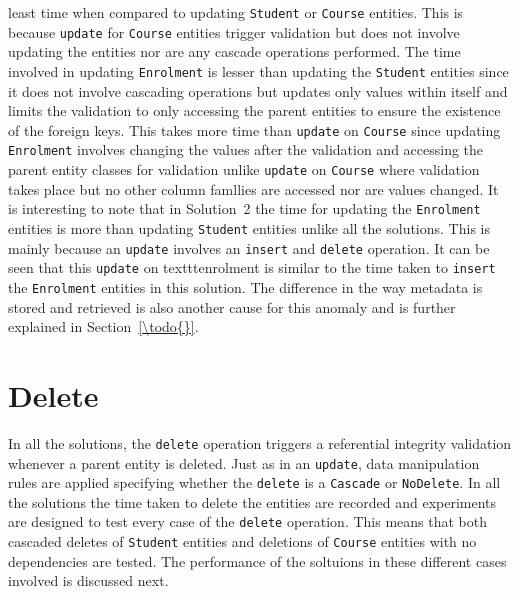 least time when compared to updating \texttt{Student} or \texttt{Course}
entities.
This is because \texttt{update} for \texttt{Course} entities trigger validation
but does not involve updating the entities nor are any cascade operations performed.
The time involved in updating \texttt{Enrolment} is lesser than updating the
\texttt{Student} entities since it does not involve cascading operations but
updates only values within itself and limits the validation to only accessing
the parent entities to ensure the existence of the foreign keys. This takes more
time than \texttt{update} on \texttt{Course} since updating \texttt{Enrolment}
involves changing the values after the validation and accessing the parent
entity classes for validation unlike \texttt{update} on \texttt{Course} where
validation takes place but no other column famllies are accessed nor are values
changed. It is interesting to note that in 	Solution~2 the time for updating the
\texttt{Enrolment} entities is more than updating \texttt{Student} entities
unlike all the solutions. This is mainly because an \texttt{update} involves an
\texttt{insert} and \texttt{delete} operation. It can be seen that this
\texttt{update} on textttenrolment is similar to the time taken to
\texttt{insert} the \texttt{Enrolment} entities in this solution. The difference
in the way metadata is stored and retrieved is also another cause for this
anomaly and is further explained in Section~\ref{\todo{}}.


\section{Delete}\label{sr:delete}
In all the solutions, the \texttt{delete} operation triggers a referential
integrity validation whenever a parent entity is deleted. Just as in an
\texttt{update}, data manipulation rules are  applied specifying whether the
\texttt{delete} is a \texttt{Cascade} or \texttt{NoDelete}. In all the solutions
the time taken to delete the entities  are recorded and experiments are designed
to test every case of the \texttt{delete} operation. This means that both
cascaded deletes of \texttt{Student} entities and deletions of
\texttt{Course} entities with no dependencies are tested. The performance of the
soltuions in these different cases involved is discussed
next.


\newcommand{\Width}{.5\textwidth}
% 	

